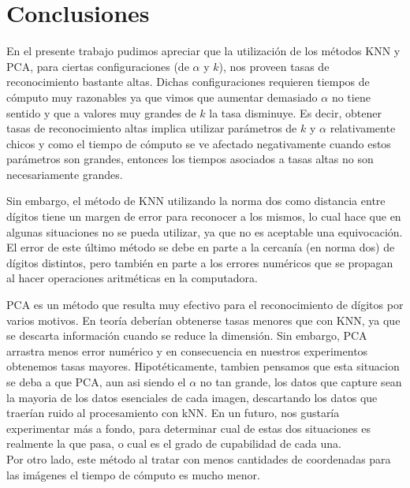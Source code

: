 \section{Conclusiones}

En el presente trabajo pudimos apreciar que la utilización de los métodos KNN y PCA, para ciertas configuraciones (de $\alpha$ y $k$), nos proveen tasas de reconocimiento bastante altas. Dichas configuraciones requieren tiempos de cómputo muy razonables ya que vimos que aumentar demasiado $\alpha$ no tiene sentido y que a valores muy grandes de $k$ la tasa disminuye. Es decir, obtener tasas de reconocimiento altas implica utilizar parámetros de $k$ y $\alpha$ relativamente chicos y como el tiempo de cómputo se ve afectado negativamente cuando estos parámetros son grandes, entonces los tiempos asociados a tasas altas no son necesariamente grandes.

Sin embargo, el método de KNN utilizando la norma dos como distancia entre dígitos tiene un margen de error para reconocer a los mismos, lo cual hace que en algunas situaciones no se pueda utilizar, ya que no es aceptable una equivocación. El error de este último método se debe en parte a la cercanía (en norma dos) de dígitos distintos, pero también en parte a los errores numéricos que se propagan al hacer operaciones aritméticas en la computadora.

PCA es un método que resulta muy efectivo para el reconocimiento de dígitos por varios motivos. En teoría deberían obtenerse tasas menores que con KNN, ya que se descarta información cuando se reduce la dimensión. Sin embargo, PCA arrastra menos error numérico y en consecuencia en nuestros experimentos obtenemos tasas mayores. Hipotéticamente, tambien pensamos que esta situacion se deba a que PCA, aun asi siendo el $\alpha$ no tan grande, los datos que capture sean la mayoria de los datos esenciales de cada imagen, descartando los datos que traerían ruido al procesamiento con kNN. En un futuro, nos gustaría experimentar más a fondo, para determinar cual de estas dos situaciones es realmente la que pasa, o cual es el grado de cupabilidad de cada una. \\
Por otro lado, este método al tratar con menos cantidades de coordenadas para las imágenes el tiempo de cómputo es mucho menor.

